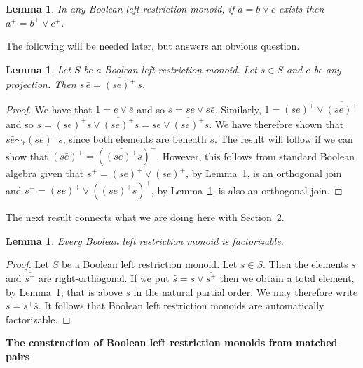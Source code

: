\documentclass[a4paper]{amsart}
\newtheorem{lemma}[theorem]{Lemma}
\begin{document}
\begin{lemma}\label{lem:induction} In any Boolean left restriction monoid,
if $a = b \vee c$ exists then $a^{+} = b^{+} \vee c^{+}$.
\end{lemma}

The following will be needed later, but answers an obvious question.

\begin{lemma}\label{lem:people} Let $S$ be a Boolean left restriction monoid.
Let $s \in S$ and $e$ be any projection.
Then $s\,\bar{e} = \overline{(se)^{+}}\,s$.
\end{lemma}
\begin{proof} We have that $1 = e \vee \bar{e}$ and so $s = se \vee s \bar{e}$.
Similarly, $1 = (se)^{+} \vee \overline{(se)^{+}}$
and so $s = (se)^{+}s \vee \overline{(se)^{+}}s = se \vee \overline{(se)^{+}}s$.
We have therefore shown that $s\bar{e} \sim_{r} \overline{(se)^{+}}s$, since both elements are beneath $s$.
The result will follow if we can show that $(s\bar{e})^{+} = (\overline{(se)^{+}}s)^{+}$.
However, this follows from standard Boolean algebra
given that $s^{+} = (se)^{+} \vee (s\bar{e})^{+}$, by Lemma~\ref{lem:induction}, is an orthogonal join
and $s^{+} = (se)^{+} \vee (\overline{(se)^{+}}s)^{+}$, by Lemma~\ref{lem:induction}, is also an orthogonal join.
\end{proof}

The next result connects what we are doing here with Section~2.

\begin{lemma} 
Every Boolean left restriction monoid is factorizable.
\end{lemma}
\begin{proof} Let $S$ be a Boolean left restriction monoid.
Let $s \in S$.
Then the elements $s$ and $\overline{s^{+}}$ are right-orthogonal.
If we put $\hat{s} = s \vee \overline{s^{+}}$ then we obtain a total element, by Lemma~\ref{lem:induction}, that is above $s$ in the natural partial order.
We may therefore write $s = s^{+}\hat{s}$.
It follows that Boolean left restriction monoids are automatically factorizable.
\end{proof}

\begin{center}
{\bf The construction of Boolean left restriction monoids from matched pairs}
\end{center}
\end{document}
